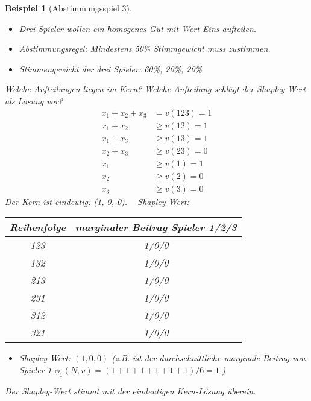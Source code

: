 \documentclass[12pt]{extreport} %
\theoremstyle{named}
\theoremstyle{itshape}
\theoremstyle{normal}
\newtheorem{beispiel}[unnamedtheorem]{Beispiel}
\begin{document}
\begin{beispiel}[Abstimmungsspiel 3] ~\
	\begin{itemize}
		\item Drei Spieler wollen ein homogenes Gut mit Wert Eins aufteilen. 
		\item Abstimmungsregel: Mindestens 50\% Stimmgewicht muss zustimmen.
		\item Stimmengewicht der drei Spieler: 60\%, 20\%, 20\%
	\end{itemize}
	Welche Aufteilungen liegen im Kern? Welche Aufteilung schlägt der Shapley-Wert als Lösung vor?
	\begin{align*}
		x_1 + x_2 + x_3 & = v(123) = 1 \\
		x_1 + x_2 & \geq v(12) = 1 \\
		x_1 + x_3 & \geq v(13) = 1 \\
		x_2 + x_3 & \geq v(23) = 0 \\
		x_1 & \geq v(1) = 1 \\
		x_2 & \geq v(2) = 0 \\
		x_3 & \geq v(3) = 0 		
	\end{align*}
	Der Kern ist eindeutig: (1, 0, 0). ~\newpage
	Shapley-Wert: ~\\
	  \begin{figure*}[h!] \centering
		\begin{tabular}{cc}
  			\hline
  				Reihenfolge & marginaler Beitrag Spieler 1/2/3 \\
  			\hline
  				123 & 1/0/0 \\
  				132 & 1/0/0 \\
  				213 & 1/0/0 \\
  				231 & 1/0/0 \\
  				312 & 1/0/0 \\
  				321 & 1/0/0 \\
  			\hline
		\end{tabular}
	\end{figure*}
	\begin{itemize}
		\item Shapley-Wert: $\left( 1, 0, 0 \right)$ (z.B. ist der durchschnittliche marginale Beitrag von Spieler 1 $\phi_1(N, v) = (1+1+1+1+1+1)/6 = 1$.)
	\end{itemize}
	Der Shapley-Wert stimmt mit der eindeutigen Kern-Lösung überein.
\end{beispiel}
\end{document}
